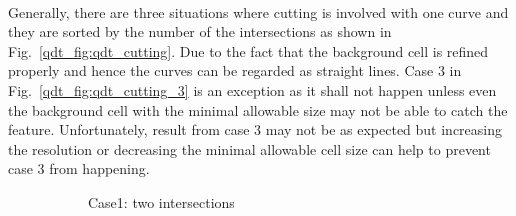 \paragraph{}
Generally, there are three situations where cutting is involved with one curve and they are sorted by the number of the intersections as shown in Fig.~\ref{qdt_fig:qdt_cutting}.
Due to the fact that the background cell is refined properly and hence the curves can be regarded as straight lines.
Case 3 in Fig.~\ref{qdt_fig:qdt_cutting_3} is an exception as it shall not happen unless even the background cell with the minimal allowable size may not be able to catch the feature.
Unfortunately, result from case 3 may not be as expected but increasing the resolution or decreasing the minimal allowable cell size can help to prevent case 3 from happening.
\begin{figure}[h!]
    \begin{subfigure}[b]{0.3\linewidth}
        \caption{Case1: two intersections}
        \label{qdt_fig:qdt_cutting_2}
    \end{subfigure}
    \begin{subfigure}[b]{0.3\linewidth}
\end{subfigure}
\end{figure}
